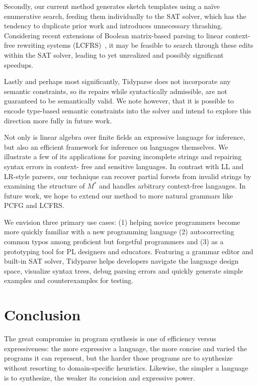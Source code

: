 \documentclass[sigplan,review,anonymous,acmsmall]{acmart}\settopmatter{printfolios=false,printccs=false,printacmref=false}
\begin{document}
Secondly, our current method generates sketch templates using a na\"ive enumerative search, feeding them individually to the SAT solver, which has the tendency to duplicate prior work and introduces unnecessary thrashing. Considering recent extensions of Boolean matrix-based parsing to linear context-free rewriting systems (LCFRS)~\cite{cohen2016parsing}, it may be feasible to search through these edits within the SAT solver, leading to yet unrealized and possibly significant speedups.

Lastly and perhaps most significantly, Tidyparse does not incorporate any semantic constraints, so its repairs while syntactically admissible, are not guaranteed to be semantically valid. We note however, that it is possible to encode type-based semantic constraints into the solver and intend to explore this direction more fully in future work.

Not only is linear algebra over finite fields an expressive language for inference, but also an efficient framework for inference on languages themselves. We illustrate a few of its applications for parsing incomplete strings and repairing syntax errors in context- free and sensitive languages. In contrast with LL and LR-style parsers, our technique can recover partial forests from invalid strings by examining the structure of $M^*$ and handles arbitrary context-free langauges. In future work, we hope to extend our method to more natural grammars like PCFG and LCFRS.

We envision three primary use cases: (1) helping novice programmers become more quickly familiar with a new programming language (2) autocorrecting common typos among proficient but forgetful programmers and (3) as a prototyping tool for PL designers and educators. Featuring a grammar editor and built-in SAT solver, Tidyparse helps developers navigate the language design space, visualize syntax trees, debug parsing errors and quickly generate simple examples and counterexamples for testing. %

\section{Conclusion}

The great compromise in program synthesis is one of efficiency versus expressiveness: the more expressive a language, the more concise and varied the programs it can represent, but the harder those programs are to synthesize without resorting to domain-specific heuristics. Likewise, the simpler a language is to synthesize, the weaker its concision and expressive power.
\end{document}
